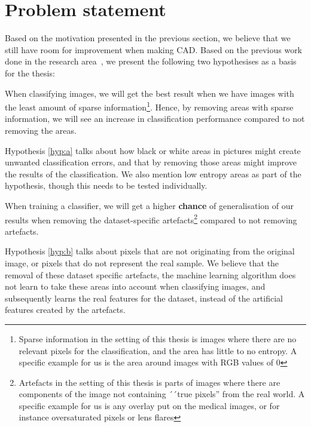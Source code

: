 \section{Problem statement}
\label{cha:problemstatement}
Based on the motivation presented in the previous section, we believe that we still have room for improvement when making CAD. Based on the previous work done in the research area~\cite{25956,25953,riegler2016eir}, we present the following two hypothesises as a basis for the thesis:


\noindent
\begin{hyp} \label{hyp:a}
When classifying images, we will get the best result when we have images with the least amount of sparse information\footnote{Sparse information in the setting of this thesis is images where there are no relevant pixels for the classification, and the area has little to no entropy. A specific example for us is the area around images with RGB values of 0}. 
Hence, by removing areas with sparse information,
we will see an increase in classification performance compared to not removing the areas.
\end{hyp}

\noindent
Hypothesis \ref{hyp:a} talks about how black or white areas in pictures might create unwanted classification errors, and that by removing those areas might improve the results of the classification. We also mention low entropy areas as part of the hypothesis, though this needs to be tested individually.


\noindent 
\begin{hyp} \label{hyp:b}
When training a classifier, we will get a higher \textbf{chance} of generalisation of our results when removing the dataset-specific artefacts\footnote{Artefacts in the setting of this thesis is parts of images where there are components of the image not containing ´´true pixels'' from the real world. A specific example for us is any overlay put on the medical images, or for instance oversaturated pixels or lens flares} compared to not removing artefacts.
\end{hyp}

\noindent
Hypothesis \ref{hyp:b} talks about pixels that are not originating from the original image, or pixels that do not represent the real sample. We believe that the removal of these dataset specific artefacts, the machine learning algorithm does not learn to take these areas into account when classifying images, and subsequently learns the real features for the dataset, instead of the artificial features created by the artefacts.


